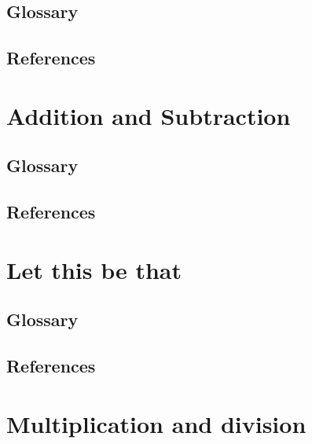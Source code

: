 \documentclass[12pt]{book}
\begin{document}
\section{Glossary}
\section{References}
\newpage

\chapter{Addition and Subtraction}%

\section{Glossary}
\section{References}
\newpage

\chapter{Let this be that}%
\section{Glossary}
\section{References}
\newpage

\chapter{Multiplication and division}%
\end{document}
